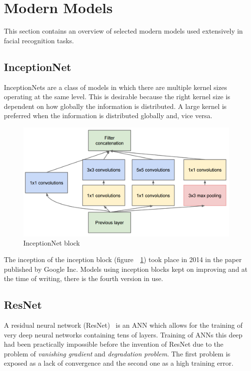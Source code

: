 \section{Modern Models}\label{sec:models}
This section contains an overview of selected modern models used extensively in facial recognition tasks.

\subsection{InceptionNet}\label{subsec:inceptionnet}
InceptionNets are a class of models in which there are multiple kernel sizes operating at the same level.
This is desirable because the right kernel size is dependent on how globally the information is distributed.
A large kernel is preferred when the information is distributed globally and, vice versa.

\begin{figure}[H]
    \centering
    \includegraphics[width=0.9\columnwidth]{images/face-recognition/inceptionnet.png}
    \caption{InceptionNet block~\cite{GoingDeeper}}
    \label{fig:InceptionNet}
\end{figure}

The inception of the inception block (figure~~\ref{fig:InceptionNet}) took place in 2014 in the paper~\cite{GoingDeeper}
published by Google Inc.
Models using inception blocks kept on improving and at the time of writing, there is the fourth version in use.

\subsection{ResNet}\label{subsec:resnet}
A residual neural network (ResNet)~\cite{ResNet} is an ANN which allows for the training of
very deep neural networks containing tens of layers.
Training of ANNs this deep had been practically impossible before the invention of ResNet due to the problem of
\textit{vanishing gradient} and \textit{degradation problem}.
The first problem is exposed as a lack of convergence and the second one as a high training error.

